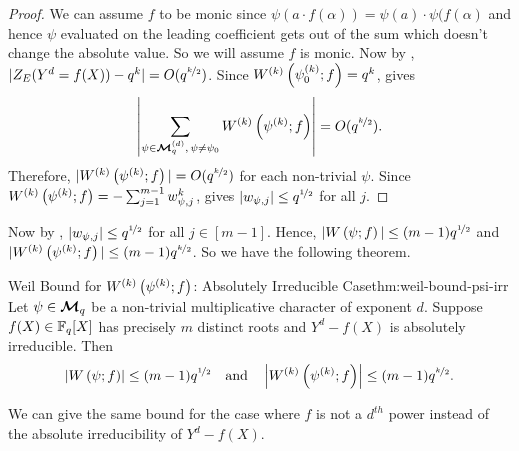 \begin{proof}
  We can assume $f$ to be monic since $\psi(a\cdot f(\alpha))=\psi(a)\cdot \psi(f(\alpha)$ and hence $\psi$ evaluated on the leading coefficient gets out of the sum which doesn't change the absolute value. So we will assume $f$ is monic. Now by \Stepanov, $|Z_E(Y^d=f(X))-q^k|=O(q^{\nicefrac{k}2})$. Since $W^{(k)}\left(\psi_0^{(k)};f\right)=q^k$, \YdFxCharSumlem gives $$\left|\sum_{\psi\in\boldsymbol{\mathcal{M}}_q^{(d)},\,\psi\neq\psi_0}W^{(k)}\left(\psi^{(k)};f\right)\right|=O(q^{\nicefrac{k}2}).$$Therefore, $|W^{(k)}\left(\psi^{(k)};f\right)|=O(q^{\nicefrac{k}2})$ for each non-trivial $\psi$. Since $W^{(k)}\left(\psi^{(k)};f\right)=-\sum_{j=1}^{m-1}w_{\psi,j}^k$, \PowerSumBound gives $|w_{\psi,j}|\leq q^{\nicefrac12}$ for all $j$.
\end{proof}

Now by , $|w_{\psi,j}|\leq q^{\nicefrac12}$ for all $j\in[m-1]$. Hence, $|W\left(\psi;f\right)|\leq (m-1)q^{\nicefrac12}$ and $|W^{(k)}\left(\psi^{(k)};f\right)|\leq (m-1)q^{\nicefrac{k}2}$. So we have the following theorem. 
\begin{Theorem}{Weil Bound for $W^{(k)}\left(\psi^{(k)};f\right)$: Absolutely Irreducible Case}{thm:weil-bound-psi-irr}
  Let $\psi\in\boldsymbol{\mathcal{M}}_q$ be a non-trivial multiplicative character of exponent $d$. Suppose $f(X)\in\mathbb{F}_q[X]$ has precisely $m$ distinct roots and $Y^d-f(X)$ is absolutely irreducible. Then
  $$\left|W\left(\psi;f\right)\right|\leq (m-1)q^{\nicefrac12}\quad\text{and}\quad \left|W^{(k)}\left(\psi^{(k)};f\right)\right|\leq (m-1)q^{\nicefrac{k}2}.$$
\end{Theorem}

We can give the same bound for the case where $f$ is not a $d^{th}$ power instead of the absolute irreducibility of $Y^d-f(X)$. 

